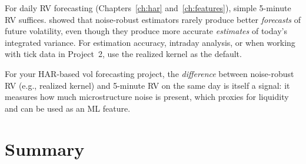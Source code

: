 \begin{keyidea}
For daily RV forecasting (Chapters~\ref{ch:har} and~\ref{ch:features}), simple 5-minute RV suffices.
\citet{LPS2015} showed that noise-robust estimators rarely produce better \emph{forecasts} of future volatility, even though they produce more accurate \emph{estimates} of today's integrated variance.
For estimation accuracy, intraday analysis, or when working with tick data in Project~2, use the realized kernel as the default.
\end{keyidea}

\begin{projectconnection}
For your HAR-based vol forecasting project, the \emph{difference} between noise-robust RV (e.g., realized kernel) and 5-minute RV on the same day is itself a signal: it measures how much microstructure noise is present, which proxies for liquidity and can be used as an ML feature.
\end{projectconnection}


\section*{Summary}

